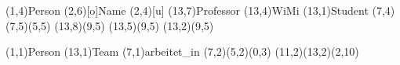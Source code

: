 \documentclass[11pt,a4paper]{article}
\begin{document}
 

\begin{schema}
  \entity(1,4){Person}
  \attr(2,6)[o]{Name}
  \attr(2,4)[u]{}
  \relation(13,7){Professor}
  \relation(13,4){WiMi}
  \relation(13,1){Student}
  \cluster(7,4)
  \conn(7,5)(5,5){}
  \conn(13,8)(9,5){}
  \conn(13,5)(9,5){}
  \conn(13,2)(9,5){}
\end{schema}

\begin{schema}
  \entity(1,1){Person}
  \entity(13,1){Team}
  \relation(7,1){arbeitet\_in}
  \conn(7,2)(5,2){(0,3)}
  \conn(11,2)(13,2){(2,10)}
\end{schema}
\end{document}
